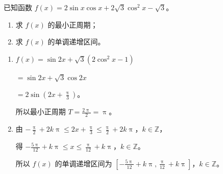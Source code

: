 \documentclass{exam-zh}
\begin{document}
\begin{problem}[points = 10]
  已知函数 $f(x) = 2\sin x \cos x + 2\sqrt{3}\cos^2 x - \sqrt{3}$。

  \begin{enumerate}
    \item 求 $f(x)$ 的最小正周期；
    \item 求 $f(x)$ 的单调递增区间。
  \end{enumerate}

  \begin{solution}
    \begin{enumerate}
      \item $f(x) = \sin 2x + \sqrt{3}(2\cos^2 x - 1)$ 

      $= \sin 2x + \sqrt{3}\cos 2x$ 

      $= 2\sin(2x + \frac{\uppi}{3})$。

      所以最小正周期 $T = \frac{2\uppi}{2} = \uppi$。

      \item 由 $-\frac{\uppi}{2} + 2k\uppi \leq 2x + \frac{\uppi}{3} \leq \frac{\uppi}{2} + 2k\uppi$，$k \in \mathbb{Z}$，

      得 $-\frac{5\uppi}{12} + k\uppi \leq x \leq \frac{\uppi}{12} + k\uppi$，$k \in \mathbb{Z}$。

      所以 $f(x)$ 的单调递增区间为 $[-\frac{5\uppi}{12} + k\uppi, \frac{\uppi}{12} + k\uppi]$，$k \in \mathbb{Z}$。
    \end{enumerate}
  \end{solution}
\end{problem}
\end{document}
